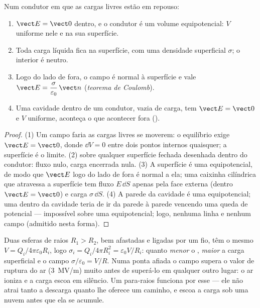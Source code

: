 \begin{theorem}\label{thm:b1:potential-capacitors:conductor}
Num condutor em que as cargas livres estão em repouso:
\begin{enumerate}
  \item $\vect E = \vect 0$ dentro, e o condutor é um volume
        equipotencial: $V$ uniforme nele e na sua superfície.
  \item Toda carga líquida fica na superfície, com uma densidade superficial
        $\sigma$; o interior é neutro.
  \item Logo do lado de fora, o campo é normal à superfície e vale
        $\vect E = \dfrac{\sigma}{\varepsilon_0}\,\vect n$ (\emph{teorema de Coulomb}).
  \item Uma cavidade dentro de um condutor, vazia de carga, tem $\vect E =
        \vect 0$ e $V$ uniforme, aconteça o que acontecer fora (\emph{}).
\end{enumerate}
\end{theorem}

\begin{proof}
(1) Um campo faria as cargas livres se moverem: o equilíbrio exige $\vect E =
\vect 0$, donde $\dd V = 0$ entre dois pontos internos quaisquer; a superfície é
o limite. (2)  sobre qualquer superfície fechada desenhada dentro do
condutor: fluxo nulo, carga encerrada nula. (3) A superfície é uma
equipotencial, de modo que $\vect E$ logo do lado de fora é normal a ela; uma caixinha
cilíndrica que atravessa a superfície tem fluxo $E\,\dd S$ apenas pela face externa
(dentro $\vect E = \vect 0$) e carga $\sigma\,\dd S$. (4) A parede da
cavidade é uma equipotencial; uma  dentro da cavidade teria de
ir da parede à parede vencendo uma queda de potencial --- impossível sobre
uma equipotencial; logo, nenhuma linha e nenhum campo (admitido nesta forma).
\end{proof}

\begin{example}\label{ex:b1:potential-capacitors:point}
Duas esferas de raios $R_1 > R_2$, bem afastadas e ligadas por um fio, têm
o mesmo $V = Q_i/4\pi\varepsilon_0R_i$, logo $\sigma_i = Q_i/4\pi R_i^2 = \varepsilon_0V/R_i$:
quanto \emph{menor} o , \emph{maior} a carga superficial
e o campo $\sigma/\varepsilon_0 = V/R$. Numa ponta afiada o campo
supera o valor de ruptura do ar (\qty{3}{MV/m}) muito antes de superá-lo
em qualquer outro lugar: o ar ioniza e a carga escoa em silêncio. Um
para-raios funciona por esse \emph{} --- ele não atrai
tanto a descarga quanto lhe oferece um caminho, e escoa a carga sob uma
nuvem antes que ela se acumule.
\end{example}


